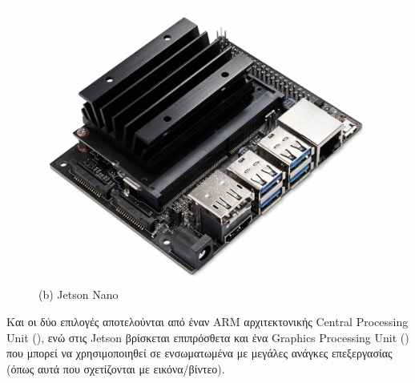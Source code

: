 \begin{figure} [H]
\begin{minipage}{.5\textwidth}
      \includegraphics[width=.9\linewidth]{../Images/Design-Implementation/jetson-nano.jpeg}\\
      {(b) Jetson Nano }
	\end{minipage}
    \hfill \break
    \decoRule
    \label{fig:embedded-linux-systems}
\end{figure}

Και οι δύο επιλογές αποτελούνται από έναν ARM αρχιτεκτονικής Central Processing Unit (), ενώ στις Jetson βρίσκεται επιπρόσθετα και ένα Graphics Processing Unit () που μπορεί να χρησιμοποιηθεί σε ενσωματωμένα με μεγάλες ανάγκες επεξεργασίας (όπως αυτά που σχετίζονται με εικόνα/βίντεο).

\begin{table}[H]
    \caption[]{Raspberry Pi 4 Model B Specifications}
    \label{tab:raspberry-pi-specs}
    \centering
  \end{table}

